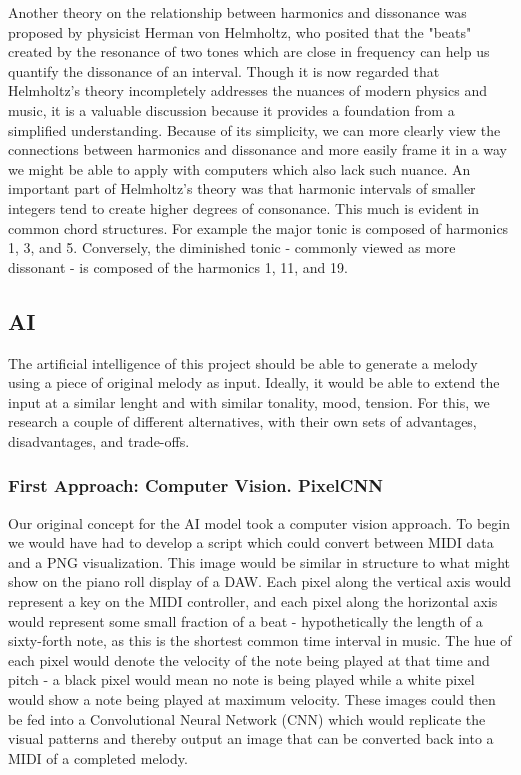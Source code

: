 Another theory on the relationship between harmonics and dissonance was proposed by physicist
Herman von Helmholtz, who posited that the "beats" created by the resonance of two tones which are
close in frequency can help us quantify the dissonance of an interval.\autocite{intervals} Though it is now regarded
that Helmholtz's theory incompletely addresses the nuances of modern physics and music, it is
a valuable discussion because it provides a foundation from a simplified understanding. Because
of its simplicity, we can more clearly view the connections between harmonics and dissonance and
more easily frame it in a way we might be able to apply with computers which also lack such nuance.
An important part of Helmholtz's theory was that harmonic intervals of smaller integers tend to
create higher degrees of consonance.\autocite{intervals} This much is evident in common chord
structures. For example the major tonic is composed of harmonics 1, 3, and 5. Conversely, the
diminished tonic - commonly viewed as more dissonant - is composed of the harmonics 1, 11, and 19.

\subsection{AI}

The artificial intelligence of this project should be able to generate a melody using
a piece of original melody as input. Ideally, it would be able to extend the input at a
similar lenght and with similar tonality, mood, tension. For this, we research
a couple of different alternatives, with their own sets of advantages, disadvantages, and
trade-offs.

\subsubsection{First Approach: Computer Vision. PixelCNN}

Our original concept for the AI model took a computer vision approach. To begin we would
have had to develop a script which could convert between MIDI data and a PNG
visualization. This image would be similar in structure to what might show on the piano
roll display of a DAW. Each pixel along the vertical axis would represent a key on the
MIDI controller, and each pixel along the horizontal axis would represent some small
fraction of a beat - hypothetically the length of a sixty-forth note, as this is the
shortest common time interval in music. The hue of each pixel would denote the velocity
of the note being played at that time and pitch - a black pixel would mean no note is
being played while a white pixel would show a note being played at maximum velocity.
These images could then be fed into a Convolutional Neural Network (CNN) which would
replicate the visual patterns and thereby output an image that can be converted back into
a MIDI of a completed melody.


